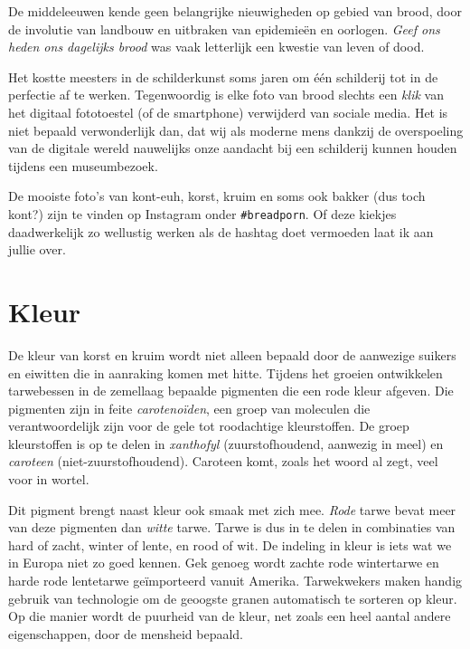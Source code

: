 \documentclass[
  11pt,
  dutch,
]{memoir}
\begin{document}
De middeleeuwen kende geen belangrijke nieuwigheden op gebied van brood,
door de involutie van landbouw en uitbraken van epidemieën en oorlogen.
\emph{Geef ons heden ons dagelijks brood} was vaak letterlijk een
kwestie van leven of dood.

Het kostte meesters in de schilderkunst soms jaren om één schilderij tot
in de perfectie af te werken. Tegenwoordig is elke foto van brood
slechts een \emph{klik} van het digitaal fototoestel (of de smartphone)
verwijderd van sociale media. Het is niet bepaald verwonderlijk dan, dat
wij als moderne mens dankzij de overspoeling van de digitale wereld
nauwelijks onze aandacht bij een schilderij kunnen houden tijdens een
museumbezoek.

De mooiste foto's van kont-euh, korst, kruim en soms ook bakker (dus
toch kont?) zijn te vinden op Instagram onder \texttt{\#breadporn}. Of
deze kiekjes daadwerkelijk zo wellustig werken als de hashtag doet
vermoeden laat ik aan jullie over.

\hypertarget{kleur}{%
\section{Kleur}\label{kleur}}

De kleur van korst en kruim wordt niet alleen bepaald door de aanwezige
suikers en eiwitten die in aanraking komen met hitte. Tijdens het
groeien ontwikkelen tarwebessen in de zemellaag bepaalde pigmenten die
een rode kleur afgeven. Die pigmenten zijn in feite \emph{carotenoïden},
een groep van moleculen die verantwoordelijk zijn voor de gele tot
roodachtige kleurstoffen. De groep kleurstoffen is op te delen in
\emph{xanthofyl} (zuurstofhoudend, aanwezig in meel) en \emph{caroteen}
(niet-zuurstofhoudend). Caroteen komt, zoals het woord al zegt, veel
voor in wortel.

Dit pigment brengt naast kleur ook smaak met zich mee. \emph{Rode} tarwe
bevat meer van deze pigmenten dan \emph{witte} tarwe. Tarwe is dus in te
delen in combinaties van hard of zacht, winter of lente, en rood of wit.
De indeling in kleur is iets wat we in Europa niet zo goed kennen. Gek
genoeg wordt zachte rode wintertarwe en harde rode lentetarwe
geïmporteerd vanuit Amerika. Tarwekwekers maken handig gebruik van
technologie om de geoogste granen automatisch te sorteren op kleur. Op
die manier wordt de puurheid van de kleur, net zoals een heel aantal
andere eigenschappen, door de mensheid bepaald.

\label{mout}
\end{document}

